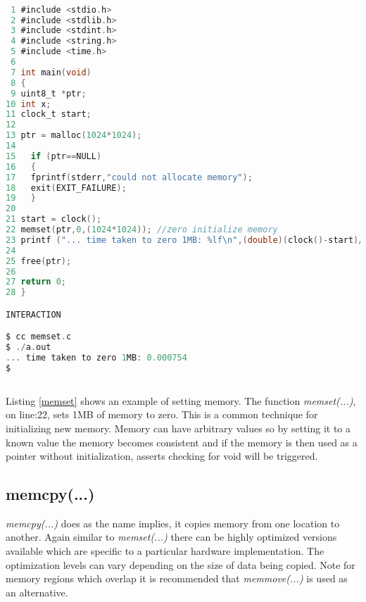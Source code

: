 \begin{lstlisting}[language=C,showstringspaces=false,caption={File: memset.c},captionpos=b,label=memset]

 1 #include <stdio.h>
 2 #include <stdlib.h>
 3 #include <stdint.h>
 4 #include <string.h>
 5 #include <time.h>
 6 
 7 int main(void)
 8 {
 9 uint8_t *ptr;
10 int x;
11 clock_t start;
12 
13 ptr = malloc(1024*1024);
14 
15   if (ptr==NULL)
16   {
17   fprintf(stderr,"could not allocate memory");
18   exit(EXIT_FAILURE);
19   }
20 
21 start = clock();
22 memset(ptr,0,(1024*1024)); //zero initialize memory
23 printf ("... time taken to zero 1MB: %lf\n",(double)(clock()-start)/CLOCKS_PER_SEC);
24 
25 free(ptr);
26 
27 return 0;
28 }

INTERACTION

$ cc memset.c
$ ./a.out
... time taken to zero 1MB: 0.000754
$ 
	
\end{lstlisting}

Listing \ref{memset} shows an example of setting memory. The function \textit{memset(...)}, on line:22, sets 1MB of memory to zero. This is a common technique for initializing new memory. Memory can have arbitrary values so by setting it to a known value the memory becomes consistent and if the memory is then used as a pointer without initialization, asserts checking for void will be triggered.

\subsection{memcpy(...)}

\textit{memcpy(...)} does as the name implies, it copies memory from one location to another. Again similar to \textit{memset(...)} there can be highly optimized versions available which are specific to a particular hardware implementation. The optimization levels can vary depending on the size of data being copied. Note for memory regions which overlap it is recommended that \textit{memmove(...)} is used as an alternative. 

